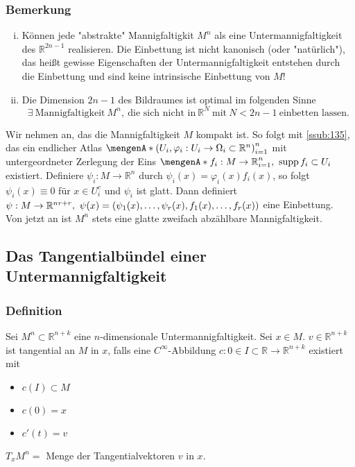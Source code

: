\subsubsection{Bemerkung}
\label{ssub:138}
\begin{enumerate}[(i)]
\item Können jede "abstrakte" Mannigfaltigkit $M^n$ als eine Untermannigfaltigkeit des $\mathds{R}^{2n-1}$ realisieren.
Die Einbettung ist nicht kanonisch (oder "natürlich"), das heißt gewisse Eigenschaften der Untermannigfaltigkeit entstehen durch die Einbettung und sind keine intrinsische Einbettung von $M$!
\item Die Dimension $2n-1$ des Bildraumes ist optimal im folgenden Sinne
\[
\exists\ \text{Mannigfaltigkeit}\ M^n,\ \text{die sich nicht in}\ \mathds{R}^N\ \text{mit}\ N<2n-1\ \text{einbetten lassen.}
\]
\end{enumerate}
Wir nehmen an, das die Mannigfaltigkeit $M$ kompakt ist. So folgt mit \ref{ssub:135}, das ein endlicher Atlas $\set{\enbrace{U_i,\varphi_i : U_i \to \Omega_i\subset \mathds{R}^n}}_{i=1}^n$ mit untergeordneter Zerlegung der Eins $\set{f_i:M\to \mathds{R}}_{i=1}^n,\ \supp f_i \subset U_i$ existiert. Definiere $\psi_i:M\to \mathds{R}^n$ durch $\psi_i(x) = \varphi_i(x)f_i(x)$, so folgt $\psi_i(x) \equiv 0$ für $x\in U_i^c$ und $\psi_i$ ist glatt. Dann definiert $\psi: M\to \mathds{R}^{nr+r},\ \psi(x)=\enbrace{\psi_1(x),\ldots,\psi_r(x),f_1(x),\ldots,f_r(x)}$ eine Einbettung.\\
Von jetzt an ist $M^n$ stets eine glatte zweifach abzählbare Mannigfaltigkeit.


\subsection{Das Tangentialbündel einer Untermannigfaltigkeit}
\label{sub:14}

\subsubsection{Definition}
\label{ssub:141}
Sei $M^n\subset \mathds{R}^{n+k}$ eine $n$-dimensionale Untermannigfaltigkeit. Sei $x\in M$. $v\in \mathds{R}^{n+k}$ ist tangential an $M$ in $x$, falls eine $C^{\infty}$-Abbildung $c: 0\in I\subset \mathds{R} \to \mathds{R}^{n+k}$ existiert mit
\begin{itemize}
\item $c(I)\subset M$
\item $c(0) = x$
\item $c'(t) = v$
\end{itemize}
$T_x M^n = $ Menge der Tangentialvektoren $v$ in $x$.

